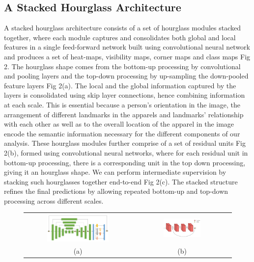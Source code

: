 \documentclass[conference]{IEEEtran}
\begin{document}
\subsection{A Stacked Hourglass Architecture}
A stacked hourglass architecture consists of a set of  hourglass modules  stacked together, where each module captures and consolidates both global and local features in a single feed-forward network built using convolutional neural network and produces a set of heat-maps, visibility maps, corner maps and class maps Fig 2. The hourglass shape comes from the bottom-up processing by convolutional and pooling layers and the top-down processing by up-sampling the down-pooled feature layers Fig 2(a). The local and the global information captured by the layers is consolidated using skip layer connections, hence combining information at each scale. This is essential because a person's orientation in the image, the arrangement of different landmarks in the apparels and landmarks' relationship with each other as well as to the overall location of the apparel in the image encode the semantic information necessary for the different components of our analysis. These hourglass modules further comprise of a set of residual units Fig 2(b), formed using convolutional neural networks, where for each residual unit in bottom-up processing, there is a corresponding unit in the top down processing, giving it an hourglass shape.  We can perform intermediate supervision by stacking such hourglasses together end-to-end Fig 2(c). The stacked structure refines the final predictions by allowing repeated bottom-up and top-down processing across different scales.

\begin{figure}[ht]
\begin{tabular}{cc}
{\includegraphics[width = 0.6\textwidth, height=0.2\textheight]{images/hourglass1.PNG}} &
{\includegraphics [width = 0.4\textwidth, height= 0.15\textheight]{images/Residualunit.PNG}} \\
(a) & (b) \\
\end{tabular}
\end{figure}
\end{document}

